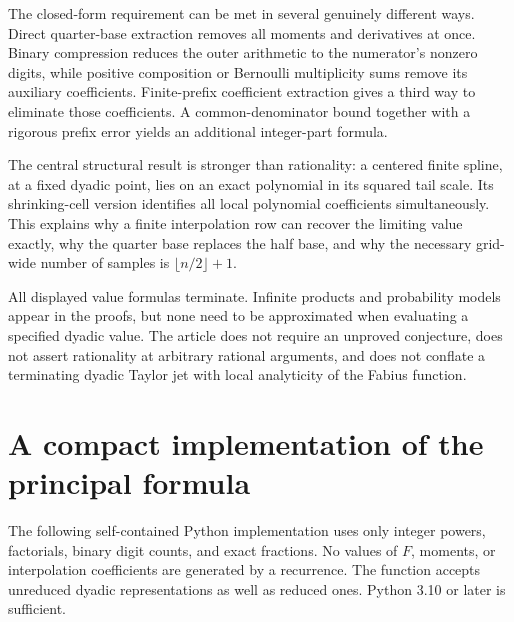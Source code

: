 \documentclass[11pt,a4paper]{article}
\numberwithin{equation}{section}
\theoremstyle{definition}
\theoremstyle{remark}
\begin{document}
The closed-form requirement can be met in several genuinely different ways. Direct quarter-base extraction removes all moments and derivatives at once. Binary compression reduces the outer arithmetic to the numerator's nonzero digits, while positive composition or Bernoulli multiplicity sums remove its auxiliary coefficients. Finite-prefix coefficient extraction gives a third way to eliminate those coefficients. A common-denominator bound together with a rigorous prefix error yields an additional integer-part formula.

The central structural result is stronger than rationality: a centered finite spline, at a fixed dyadic point, lies on an exact polynomial in its squared tail scale. Its shrinking-cell version identifies all local polynomial coefficients simultaneously. This explains why a finite interpolation row can recover the limiting value exactly, why the quarter base replaces the half base, and why the necessary grid-wide number of samples is $\lfloor n/2\rfloor+1$.

All displayed value formulas terminate. Infinite products and probability models appear in the proofs, but none need to be approximated when evaluating a specified dyadic value. The article does not require an unproved conjecture, does not assert rationality at arbitrary rational arguments, and does not conflate a terminating dyadic Taylor jet with local analyticity of the Fabius function.

\clearpage
\appendix
\section{A compact implementation of the principal formula}
\label{app:code}

The following self-contained Python implementation uses only integer powers, factorials, binary digit counts, and exact fractions. No values of $F$, moments, or interpolation coefficients are generated by a recurrence. The function accepts unreduced dyadic representations as well as reduced ones. Python 3.10 or later is sufficient.
\end{document}
